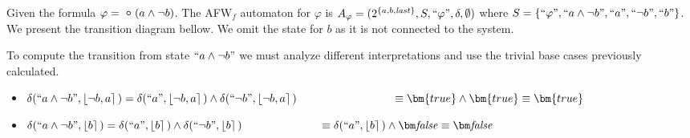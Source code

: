 \begin{example}
    Given the formula $\varphi=\Next(a\wedge \neg b)$. The AFW$_f$ automaton for $\varphi$ is $A_\varphi =(2^{\{a,b,\mathit{last}\}},S,``\varphi",\delta,\emptyset)$ where $S=\{``\varphi",``a\wedge \neg b",``a",``\neg b", ``b"\}$. We present the transition diagram bellow. We omit the state for $b$ as it is not connected to the system.

    



    To compute the transition from state $``a \wedge \neg b"$ we must analyze different interpretations and use the trivial base cases previously calculated.

    \begin{itemize}
        \small
        \item $\delta(``a \wedge \neg b",\interp{ \neg b,a })= \delta(``a",\interp{ \neg b,a }) \wedge \delta(``\neg b",\interp{ \neg b,a })\\
        \phantom{\delta(``a \wedge \neg b",\interp{ \neg b,a })} \equiv \bm{true} \wedge \bm{true} \equiv \bm{true}$


        \item $\delta(``a \wedge \neg b",\interp{ b })=
        \delta(``a",\interp{ b }) \wedge \delta(``\neg b",\interp{ b })\\
        \phantom{\delta(``a \wedge \neg b",\interp{ b })} \equiv \delta(``a",\interp{ b }) \wedge \fpbf \equiv \fpbf$
        

\end{itemize}
\end{example}
